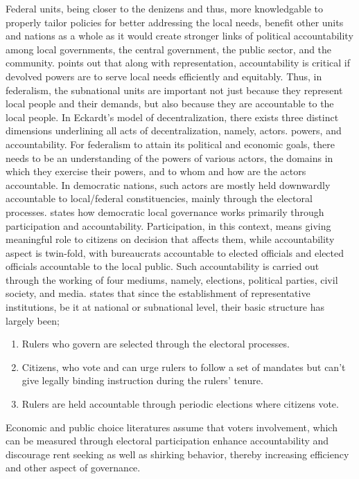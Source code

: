 Federal units, being closer to the denizens and thus, more knowledgable to properly tailor policies for better addressing the local needs, benefit other units and nations as a whole as it would create stronger links of political accountability among local governments, the central government,  the public sector, and the community\cite{Eckardt2008}.  points out that along with representation, accountability is critical if devolved powers are to serve local needs efficiently and equitably. Thus, in federalism, the subnational units are important not just because they represent local people and their demands, but also because they are accountable to the local people. In Eckardt's model of decentralization, there exists three distinct dimensions underlining all acts of decentralization, namely, actors. powers, and accountability. For federalism to attain its political and economic goals, there needs to be an understanding of the powers of various actors, the domains in which they exercise their powers, and to whom and how are the actors accountable. In democratic nations, such actors are mostly held downwardly accountable to local/federal constituencies, mainly through the electoral processes.  states how democratic local governance works primarily through participation and accountability. Participation, in this context, means giving meaningful role to citizens on decision that affects them, while accountability aspect is twin-fold, with bureaucrats accountable to elected officials and elected officials accountable to the local public. Such accountability is carried out through the working of four mediums, namely, elections, political parties, civil society, and media.  states that since the establishment of representative institutions, be it at national or subnational level, their basic structure has largely been; 
\begin{enumerate}[label=\roman*.]
    \item Rulers who govern are selected through the electoral processes. 
    \item Citizens, who vote and can urge rulers to follow a set of mandates but can't give legally binding instruction during the rulers' tenure.
    \item Rulers are held accountable through periodic elections where citizens vote.
\end{enumerate}
Economic and public choice literatures assume that voters involvement, which can be measured through electoral participation enhance accountability and discourage rent seeking as well as shirking behavior, thereby increasing efficiency and other aspect of governance\cite{Stigler1972, Barro1973}. 
